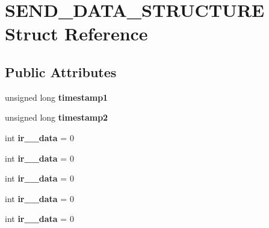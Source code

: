 \hypertarget{struct_s_e_n_d___d_a_t_a___s_t_r_u_c_t_u_r_e}{}\section{S\+E\+N\+D\+\_\+\+D\+A\+T\+A\+\_\+\+S\+T\+R\+U\+C\+T\+U\+RE Struct Reference}
\label{struct_s_e_n_d___d_a_t_a___s_t_r_u_c_t_u_r_e}
\subsection*{Public Attributes}
\begin{DoxyCompactItemize}
\item 
unsigned long {\bfseries timestamp1}\hypertarget{struct_s_e_n_d___d_a_t_a___s_t_r_u_c_t_u_r_e_a0943fbe994d0eaaff6771d41e3894aae}{}\label{struct_s_e_n_d___d_a_t_a___s_t_r_u_c_t_u_r_e_a0943fbe994d0eaaff6771d41e3894aae}

\item 
unsigned long {\bfseries timestamp2}\hypertarget{struct_s_e_n_d___d_a_t_a___s_t_r_u_c_t_u_r_e_a52e8a50f9ae7333c68e9970119f419cc}{}\label{struct_s_e_n_d___d_a_t_a___s_t_r_u_c_t_u_r_e_a52e8a50f9ae7333c68e9970119f419cc}

\item 
int {\bfseries ir\+\_\+\_\+data} = 0\hypertarget{struct_s_e_n_d___d_a_t_a___s_t_r_u_c_t_u_r_e_a67795fc35607eb2668e2671f0b06f1b2}{}\label{struct_s_e_n_d___d_a_t_a___s_t_r_u_c_t_u_r_e_a67795fc35607eb2668e2671f0b06f1b2}

\item 
int {\bfseries ir\+\_\+\_\+data} = 0\hypertarget{struct_s_e_n_d___d_a_t_a___s_t_r_u_c_t_u_r_e_a257d908a7657c84eb118049186caf4e9}{}\label{struct_s_e_n_d___d_a_t_a___s_t_r_u_c_t_u_r_e_a257d908a7657c84eb118049186caf4e9}

\item 
int {\bfseries ir\+\_\+\_\+data} = 0\hypertarget{struct_s_e_n_d___d_a_t_a___s_t_r_u_c_t_u_r_e_ad2baffc96bca820e409743ce9a6334de}{}\label{struct_s_e_n_d___d_a_t_a___s_t_r_u_c_t_u_r_e_ad2baffc96bca820e409743ce9a6334de}

\item 
int {\bfseries ir\+\_\+\_\+data} = 0\hypertarget{struct_s_e_n_d___d_a_t_a___s_t_r_u_c_t_u_r_e_a2348f951c9e4d82af2ad0b70560f79cc}{}\label{struct_s_e_n_d___d_a_t_a___s_t_r_u_c_t_u_r_e_a2348f951c9e4d82af2ad0b70560f79cc}

\item 
int {\bfseries ir\+\_\+\_\+data} = 0\hypertarget{struct_s_e_n_d___d_a_t_a___s_t_r_u_c_t_u_r_e_a6a86fa534d5b0cd1a9e604783d860867}{}\label{struct_s_e_n_d___d_a_t_a___s_t_r_u_c_t_u_r_e_a6a86fa534d5b0cd1a9e604783d860867}


\end{DoxyCompactItemize}
